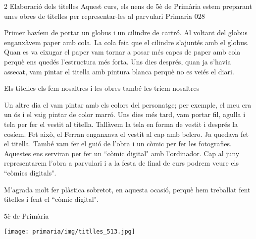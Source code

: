 \begin{news}
{2} %
{Elaboració dels titelles}
{Aquest curs, els nens de 5è de Primària estem preparant unes obres de titelles per representar-les al parvulari}
{Primaria}
{028} %




Primer havíem de portar un globus i un cilindre de cartró. Al voltant del globus enganxàvem paper amb cola. La cola feia que el cilindre s’ajuntés amb el globus. Quan es va eixugar el paper vam tornar a posar més capes de paper amb cola perquè ens quedés l’estructura més forta. Uns dies després, quan ja s’havia assecat, vam pintar el titella amb pintura blanca perquè no es veiés el diari. 

{Els titelles els fem nosaltres i les obres també les triem nosaltres}

Un altre dia el vam pintar amb els colors del personatge; per exemple, el meu  era un ós i el vaig pintar de color marró. Uns dies més tard, vam portar fil, agulla i tela per fer el vestit al titella. Tallàvem la tela en forma de vestit i després la cosíem. Fet això, el Ferran enganxava el vestit al cap amb belcro. Ja quedava fet el titella. També vam fer el guió de l’obra i un còmic per fer les fotografies. Aquestes ens serviran per fer un ``còmic digital" amb l’ordinador. Cap al juny representarem l’obra a parvulari i a la festa de final de curs podrem veure els ``còmics digitals".


M’agrada molt fer plàstica  sobretot, en aquesta ocasió, perquè hem treballat fent titelles i fent el ``còmic digital".

{5è de Primària}

\noindent\texttt{[image: primaria/img/titlles\_513.jpg]}

\end{news}
